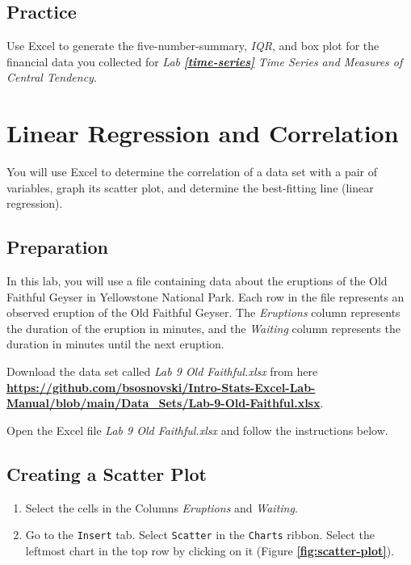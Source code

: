 \documentclass[
]{book}
\providecommand{\tightlist}{%
  \setlength{\itemsep}{0pt}\setlength{\parskip}{0pt}}
\begin{document}
\hypertarget{practice-6}{%
\section{Practice}\label{practice-6}}

Use Excel to generate the five-number-summary, \emph{IQR}, and box plot for the financial data you collected for \emph{Lab} \textbf{\emph{\ref{time-series}}} \emph{Time Series and Measures of Central Tendency}.

\hypertarget{linear-regression-and-correlation}{%
\chapter{Linear Regression and Correlation}\label{linear-regression-and-correlation}}

You will use Excel to determine the correlation of a data set with a pair of variables, graph its scatter plot, and determine the best-fitting line (linear regression).

\hypertarget{preparation-6}{%
\section{Preparation}\label{preparation-6}}

In this lab, you will use a file containing data about the eruptions of the Old Faithful Geyser in Yellowstone National Park. Each row in the file represents an observed eruption of the Old Faithful Geyser. The \emph{Eruptions} column represents the duration of the eruption in minutes, and the \emph{Waiting} column represents the duration in minutes until the next eruption.

Download the data set called \emph{Lab 9 Old Faithful.xlsx} from here \href{https://github.com/bsosnovski/Intro-Stats-Excel-Lab-Manual/blob/main/Data_Sets/Lab-9-Old-Faithful.xlsx}{\textbf{https://github.com/bsosnovski/Intro-Stats-Excel-Lab-Manual/blob/main/Data\_Sets/Lab-9-Old-Faithful.xlsx}}.

Open the Excel file \emph{Lab 9 Old Faithful.xlsx} and follow the instructions below.

\hypertarget{create-scatter-plot}{%
\section{Creating a Scatter Plot}\label{create-scatter-plot}}

\begin{enumerate}
\def\labelenumi{\arabic{enumi}.}
\tightlist
\item
  Select the cells in the Columns \emph{Eruptions} and \emph{Waiting}.
\item
  Go to the \texttt{Insert} tab. Select \texttt{Scatter} in the \texttt{Charts} ribbon. Select the leftmost chart in the top row by clicking on it (Figure \textbf{\ref{fig:scatter-plot}}).
\end{enumerate}
\end{document}
